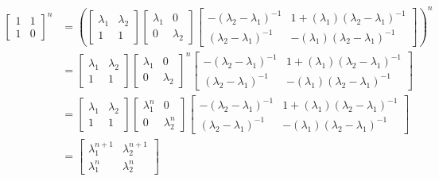 \documentclass{article}
\begin{document}
\begin{align*}
\begin{bmatrix}
1 & 1 \\
1 & 0
\end{bmatrix}^{n}
&=
\left(
\begin{bmatrix}
\lambda_{1} & \lambda_{2} \\
1 & 1
\end{bmatrix}
\begin{bmatrix}
\lambda_{1} & 0 \\
0 & \lambda_{2}
\end{bmatrix}
\begin{bmatrix}
-(\lambda_{2}-\lambda_{1})^{-1} & 1+(\lambda_{1})(\lambda_{2}-\lambda_{1})^{-1} \\
(\lambda_{2}-\lambda_{1})^{-1} & -(\lambda_{1})(\lambda_{2}-\lambda_{1})^{-1}
\end{bmatrix}
\right)^{n} \\
&=
\begin{bmatrix}
\lambda_{1} & \lambda_{2} \\
1 & 1
\end{bmatrix}
\begin{bmatrix}
\lambda_{1} & 0 \\
0 & \lambda_{2}
\end{bmatrix}^{n}
\begin{bmatrix}
-(\lambda_{2}-\lambda_{1})^{-1} & 1+(\lambda_{1})(\lambda_{2}-\lambda_{1})^{-1} \\
(\lambda_{2}-\lambda_{1})^{-1} & -(\lambda_{1})(\lambda_{2}-\lambda_{1})^{-1}
\end{bmatrix}\\
&=
\begin{bmatrix}
\lambda_{1} & \lambda_{2} \\
1 & 1
\end{bmatrix}
\begin{bmatrix}
\lambda_{1}^{n} & 0 \\
0 & \lambda_{2}^{n}
\end{bmatrix}
\begin{bmatrix}
-(\lambda_{2}-\lambda_{1})^{-1} & 1+(\lambda_{1})(\lambda_{2}-\lambda_{1})^{-1} \\
(\lambda_{2}-\lambda_{1})^{-1} & -(\lambda_{1})(\lambda_{2}-\lambda_{1})^{-1}
\end{bmatrix}\\
&=
\begin{bmatrix}
\lambda_{1}^{n+1} & \lambda_{2}^{n+1} \\
\lambda_{1}^{n} & \lambda_{2}^{n}

\end{bmatrix}
\end{align*}
\end{document}

